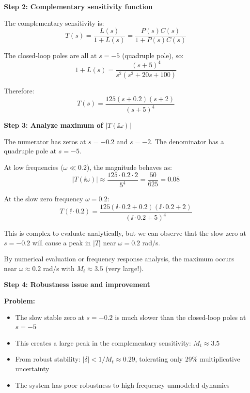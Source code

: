 \documentclass[11pt,a4paper]{article}
\begin{document}
\textbf{Step 2: Complementary sensitivity function}

The complementary sensitivity is:
\begin{equation}
  T(s) = \frac{L(s)}{1 + L(s)} = \frac{P(s)C(s)}{1 + P(s)C(s)}
\end{equation}

The closed-loop poles are all at $s = -5$ (quadruple pole), so:
\begin{equation}
  1 + L(s) = \frac{(s+5)^4}{s^2(s^2 + 20s + 100)}
\end{equation}

Therefore:
\begin{equation}
  T(s) = \frac{125(s + 0.2)(s + 2)}{(s+5)^4}
\end{equation}

\textbf{Step 3: Analyze maximum of $|T(\ii\omega)|$}

The numerator has zeros at $s = -0.2$ and $s = -2$.
The denominator has a quadruple pole at $s = -5$.

At low frequencies ($\omega \ll 0.2$), the magnitude behaves as:
\begin{equation}
  |T(\ii\omega)| \approx \frac{125 \cdot 0.2 \cdot 2}{5^4} = \frac{50}{625} = 0.08
\end{equation}

At the slow zero frequency $\omega = 0.2$:
\begin{equation}
  T(\ii \cdot 0.2) = \frac{125(\ii \cdot 0.2 + 0.2)(\ii \cdot 0.2 + 2)}{(\ii \cdot 0.2 + 5)^4}
\end{equation}

This is complex to evaluate analytically, but we can observe that the slow zero at $s = -0.2$ will cause a peak in $|T|$ near $\omega = 0.2$ rad/s.

By numerical evaluation or frequency response analysis, the maximum occurs near $\omega \approx 0.2$ rad/s with $M_t \approx 3.5$ (very large!).

\textbf{Step 4: Robustness issue and improvement}

\textbf{Problem:}
\begin{itemize}
  \item The slow stable zero at $s = -0.2$ is much slower than the closed-loop poles at $s = -5$
  \item This creates a large peak in the complementary sensitivity: $M_t \approx 3.5$
  \item From robust stability: $|\delta| < 1/M_t \approx 0.29$, tolerating only 29\% multiplicative uncertainty
  \item The system has poor robustness to high-frequency unmodeled dynamics
\end{itemize}
\end{document}
